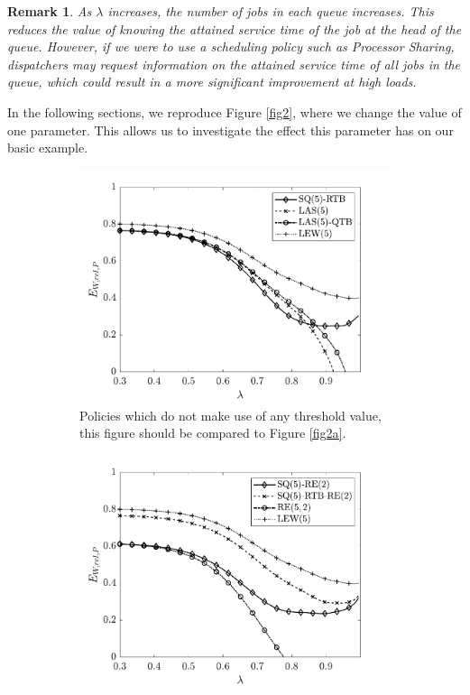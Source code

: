 \documentclass[12pt]{report}
\newtheorem{remark}{Remark}
\begin{document}
\begin{remark}
As $\lambda$ increases, the number of jobs in each queue increases. This reduces the value of knowing the attained service time of the job at the head of the queue. However, if we were to use a scheduling policy such as Processor Sharing, dispatchers may request information on the attained service time of all jobs in the queue, which could result in a more significant improvement at high loads.
\end{remark}
In the following sections, we reproduce Figure \ref{fig2}, where we change the value of one parameter. This allows us to investigate the effect this parameter has on our basic example.

\begin{figure}[t]
\begin{center}
\begin{subfigure}{0.43\textwidth}
\centering
\captionsetup{width=.8\linewidth}
\includegraphics[width=1\linewidth]{figures/Chapter7/fig14a.pdf}
\caption{Policies which do not make use of any threshold value, this figure should be compared to Figure \ref{fig2a}.}
\label{fig14a}
\end{subfigure}
\begin{subfigure}{.43\textwidth}
\centering
\captionsetup{width=.8\linewidth}
\includegraphics[width=1\linewidth]{figures/Chapter7/fig14b.pdf}

\end{subfigure}
\end{center}
\end{figure}
\end{document}
